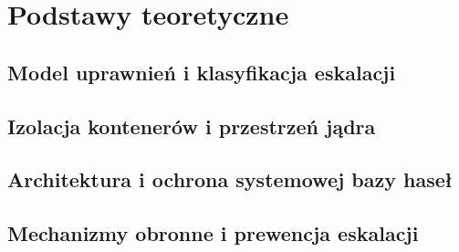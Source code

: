 \chapter{Podstawy teoretyczne}\label{ch:podstawy-teoretyczne}

\section{Model uprawnień i klasyfikacja eskalacji}\label{sec:model-klasyfikacja}

\section{Izolacja kontenerów i przestrzeń jądra}\label{sec:kontenery-jadro}

\section{Architektura i ochrona systemowej bazy haseł}\label{sec:ochrona-bazy-hasel}

\section{Mechanizmy obronne i prewencja eskalacji}\label{sec:mechanizmy-obronne}

